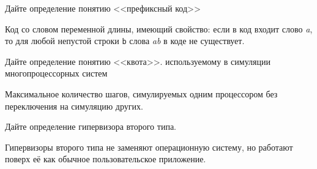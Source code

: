 \documentclass[a4paper, addpoints]{exam}
\begin{document}
\begin{questions}
\question[3] Дайте определение понятию <<префиксный код>>
\begin{solution}[1cm]
Код со словом переменной длины, имеющий свойство: если в код входит слово \textit{a}, то для любой непустой строки \texttt{b} слова \textit{ab} в коде не существует. 
\end{solution}


\question[3] Дайте определение понятию <<квота>>. используемому в симуляции многопроцессорных систем
\begin{solution}[1cm]
Максимальное количество шагов, симулируемых одним процессором без переключения на симуляцию других.
\end{solution}

\question[3] Дайте определение гипервизора второго типа.
\begin{solution}[2cm]
Гипервизоры второго типа  не заменяют операционную систему, но работают поверх её как обычное пользовательское приложение.
\end{solution}


    


    

\end{questions}
\end{document}
